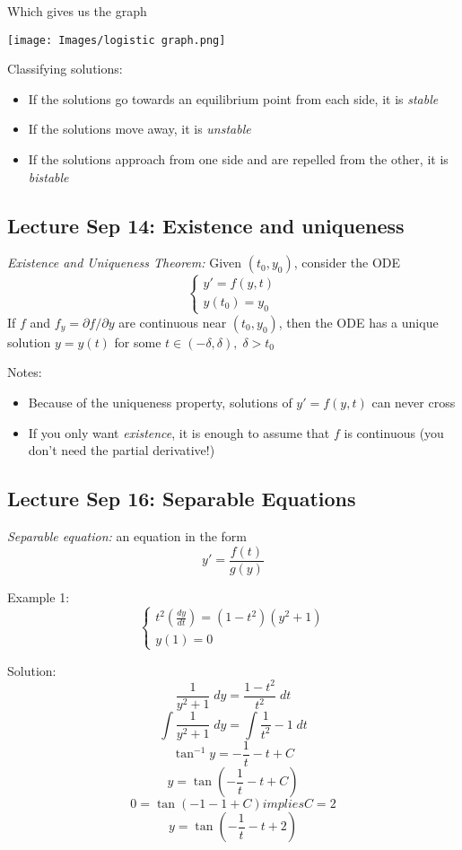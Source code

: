 \documentclass[12pt]{article}
\begin{document}
Which gives us the graph 

\texttt{[image: Images/logistic graph.png]}

Classifying solutions:
\begin{itemize}
    \item If the solutions go towards an equilibrium point from each side, it is \emph{stable}
    \item If the solutions move away, it is \emph{unstable}
    \item If the solutions approach from one side and are repelled from the other, it is \emph{bistable}
\end{itemize}

\subsection*{Lecture Sep 14: Existence and uniqueness}
\emph{Existence and Uniqueness Theorem:}
Given $(t_0, y_0)$, consider the ODE 
\[\begin{cases}
    y' = f(y, t)\\
    y(t_0) = y_0
\end{cases}\]
If $f$ and $f_y = \partial f / \partial y$ are continuous near $(t_0, y_0)$, then the ODE has a unique solution $y = y(t)$ for some $t \in (-\delta, \delta), \; \delta > t_0$

Notes:
\begin{itemize}
    \item Because of the uniqueness property, solutions of $y' = f(y, t)$ can never cross
    \item If you only want \emph{existence}, it is enough to assume that $f$ is continuous (you don't need the partial derivative!) 
\end{itemize}

\subsection*{Lecture Sep 16: Separable Equations}
\emph{Separable equation:} an equation in the form 
\[y' = \frac{f(t)}{g(y)}\]

Example 1:
\[\begin{cases}
    t^2 \left(\frac{dy}{dt}\right) = (1 -t^2)(y^2 + 1)\\
    y(1) = 0
\end{cases}\]

Solution:
\[\frac{1}{y^2 + 1} \; dy = \frac{1 - t^2}{t^2} \; dt\]
\[\int \frac{1}{y^2 + 1} \; dy = \int \frac{1}{t^2} - 1 \; dt\]
\[\tan^{-1} y = -\frac{1}{t} - t + C\]
\[y = \tan \left(-\frac{1}{t} - t + C\right)\]
\[0 = \tan (-1 - 1 + C) implies C = 2\]
\[\boxed{y = \tan \left(-\frac{1}{t} - t + 2\right)}\]
\end{document}
